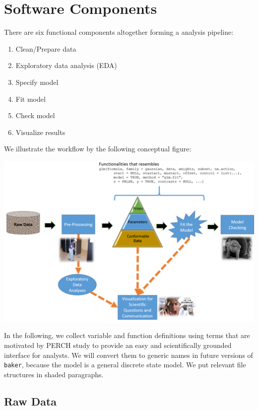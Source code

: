 \documentclass[article]{jss}
\begin{document}
\section{Software Components}\label{software-components}

There are six functional components altogether forming a analysis
pipeline:

\begin{enumerate}
\def\labelenumi{\arabic{enumi}.}
\itemsep1pt\parskip0pt
\item
  Clean/Prepare data
\item
  Exploratory data analysis (EDA)
\item
  Specify model
\item
  Fit model
\item
  Check model
\item
  Visualize results
\end{enumerate}

We illustrate the workflow by the following conceptual figure:

\includegraphics{./figures/software_structure_illustration.png}

In the following, we collect variable and function definitions using
terms that are motivated by PERCH study to provide an easy and
scientifically grounded interface for analysts. We will convert them to
generic names in future versions of \texttt{baker}, because the model is
a general discrete state model. We put relevant file structures in
shaded paragraphs.

\subsection{Raw Data}\label{raw-data}
\end{document}
